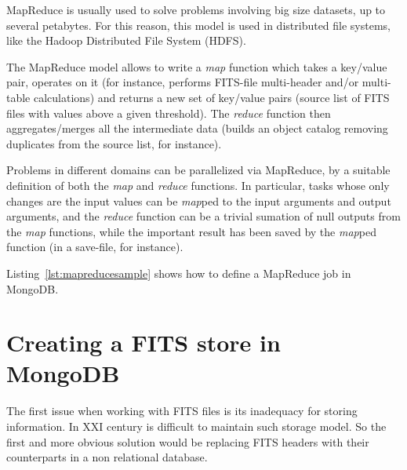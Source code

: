 MapReduce
is usually used %
to solve problems involving big size datasets, up to several petabytes. For this reason, this model is used in distributed file systems, like
the Hadoop Distributed File System (HDFS).

The MapReduce model allows to write a \emph{map} function which takes a key/value pair, operates on it
(for instance, performs FITS-file multi-header and/or multi-table calculations)
and returns a new set of key/value pairs
(source list of FITS files with values above a given threshold). %
The \emph{reduce} function then aggregates/merges all the intermediate data (builds an object catalog removing duplicates from the source list, for instance).

Problems in different domains can be parallelized via MapReduce, by a suitable definition of both the \emph{map} and \emph{reduce} functions. In particular, tasks whose only changes are the input values can be \emph{map}ped to the input arguments and output arguments, and the \emph{reduce} function can be a trivial sumation of null outputs from the \emph{map} functions, while the important result has been saved by the \emph{map}ped function (in a save-file, for instance).


Listing~\ref{lst:mapreducesample} shows how to define a MapReduce job in MongoDB.






\section{Creating a FITS store in MongoDB} %
\label{sec:creating_a_fits_store_in_mongodb}

The first issue when working with FITS files is its inadequacy for storing information. In XXI century is difficult to maintain such storage model. So the first and more obvious solution would be replacing FITS headers with their counterparts in a non relational database. 


